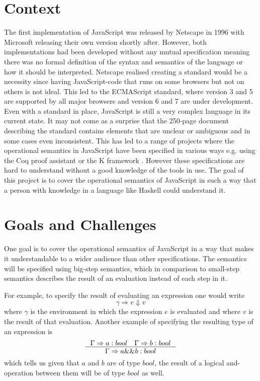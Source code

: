 \documentclass [11pt]{article}
\begin{document}
\section{Context}
The first implementation of JavaScript was released by Netscape in 1996 with Microsoft releasing their own version shortly after. However, both implementations had been developed without any mutual specification meaning there was no formal definition of the syntax and semantics of the language or how it should be interpreted. Netscape realised creating a standard would be a necessity since having JavaScript-code that runs on some browsers but not on others is not ideal. This led to the ECMAScript standard, where version 3 and 5 are supported by all major browsers and version 6 and 7 are under development. Even with a standard in place, JavaScript is still a very complex language in its current state. It may not come as a surprise that the 250-page document describing the standard contains elements that are unclear or ambiguous and in some cases even inconsistent. This has led to a range of projects where the operational semantics in JavaScript have been specified in various ways e.g. using the Coq proof assistant or the K framework \cite{coq, kframe}. However these specifications are hard to understand without a good knowledge of the tools in use. The goal of this project is to cover the operational semantics of JavaScript in such a way that a person with knowledge in a language like Haskell could understand it.

\section{Goals and Challenges}
One goal is to cover the operational semantics of JavaScript in a way that makes it understandable to a wider audience than other specifications. The semantics will be specified using big-step semantics, which in comparison to small-step semantics describes the result of an evaluation instead of each step in it. 

\newpage

For example, to specify the result of evaluating an expression one would write
\[ \gamma \Rightarrow e \Downarrow v \]
where $\gamma$ is the environment in which the expression $e$ is evaluated and where $v$ is the result of that evaluation. Another example of specifying the resulting type of an expression is
\[ 
\inference[] {
\Gamma \Rightarrow a : bool \quad \Gamma \Rightarrow b : bool 
}{\Gamma \Rightarrow a\&\&b : bool}
\]
which tells us given that $a$ and $b$ are of type $bool$, the result of a logical and-operation between them will be of type $bool$ as well.
\end{document}
